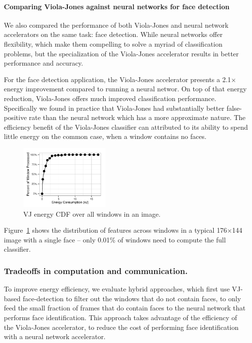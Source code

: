 \paragraph{Comparing Viola-Jones against neural networks for face detection}
We also compared the performance of both Viola-Jones and neural network accelerators
on the same task: face detection. While neural networks offer flexibility,
which make them compelling to solve a myriad of classification problems, but the
specialization of the Viola-Jones accelerator results in better performance and
accuracy.

For the face detection application, the Viola-Jones accelerator presents
a 2.1$\times$ energy improvement compared to running a neural networ. On top of that energy reduction, Viola-Jones offers much improved classification performance.
Specifically we found in practice that Viola-Jones had substantially better
false-positive rate than the neural network which has a more approximate nature.
The efficiency benefit of the Viola-Jones classifier
can attributed to its ability to spend little energy on the common case, when a
window contains no faces.

\begin{figure}[h]
\centering
    \begin{center}
      \includegraphics[width=0.4\textwidth]{nsp-figs/eval_vj_cdf.pdf}
    \end{center}
\caption{VJ energy CDF over all windows in an image.}
\label{fig:vj-cdf}
\end{figure}

Figure~\ref{fig:vj-cdf} shows the
distribution of features across windows in a typical 176$\times$144 image with a single face -- only 0.01\%
of windows need to compute the full classifier.

\subsubsection{Tradeoffs in computation and communication.} To improve energy efficiency, we evaluate hybrid approaches, which first use VJ-based face-detection
to filter out the windows that do not contain faces, to only feed the small fraction of frames that do contain faces to the neural network that performs face identification.
This approach takes advantage of the efficiency of the Viola-Jones accelerator, to reduce the cost of performing face identification with a neural network accelerator.



